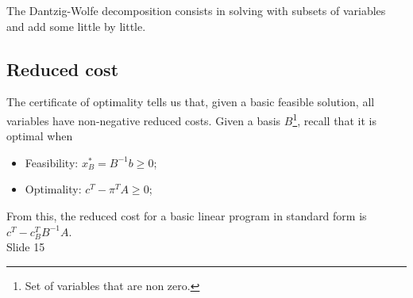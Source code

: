 \documentclass[12pt, openany]{report}
\theoremstyle{definition}
\begin{document}
The Dantzig-Wolfe decomposition consists in solving with subsets of variables and add some little by little. 
\subsection{Reduced cost}
The certificate of optimality tells us that, given a basic feasible solution, all variables have non-negative reduced costs. Given a basis $B$\footnote{Set of variables that are non zero.}, recall that it is optimal when 
\begin{itemize}
	\item Feasibility: $x_B^* =B^{-1}b\ge 0$;
	\item Optimality: $c^T - \pi^TA \ge 0$;
\end{itemize} 
From this, the reduced cost for a basic linear program in standard form is $c^T - c^T_BB^{-1}A$.\\
Slide 15
\end{document}
